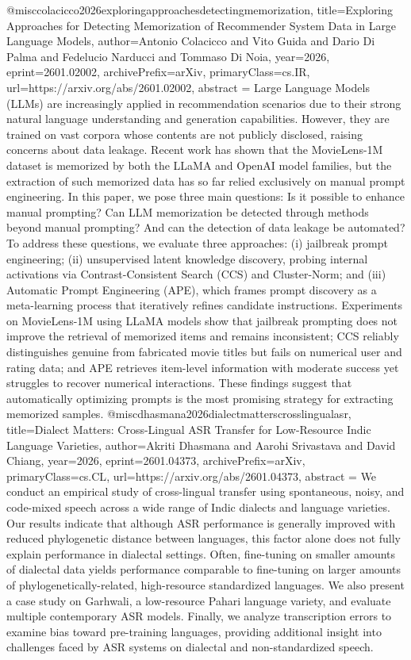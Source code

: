 {}@misc{colacicco2026exploringapproachesdetectingmemorization,
      title={Exploring Approaches for Detecting Memorization of Recommender System Data in Large Language Models}, 
      author={Antonio Colacicco and Vito Guida and Dario Di Palma and Fedelucio Narducci and Tommaso Di Noia},
      year={2026},
      eprint={2601.02002},
      archivePrefix={arXiv},
      primaryClass={cs.IR},
      url={https://arxiv.org/abs/2601.02002},
      abstract = {Large Language Models (LLMs) are increasingly applied in recommendation scenarios due to their strong natural language understanding and generation capabilities. However, they are trained on vast corpora whose contents are not publicly disclosed, raising concerns about data leakage. Recent work has shown that the MovieLens-1M dataset is memorized by both the LLaMA and OpenAI model families, but the extraction of such memorized data has so far relied exclusively on manual prompt engineering. In this paper, we pose three main questions: Is it possible to enhance manual prompting? Can LLM memorization be detected through methods beyond manual prompting? And can the detection of data leakage be automated? To address these questions, we evaluate three approaches: (i) jailbreak prompt engineering; (ii) unsupervised latent knowledge discovery, probing internal activations via Contrast-Consistent Search (CCS) and Cluster-Norm; and (iii) Automatic Prompt Engineering (APE), which frames prompt discovery as a meta-learning process that iteratively refines candidate instructions. Experiments on MovieLens-1M using LLaMA models show that jailbreak prompting does not improve the retrieval of memorized items and remains inconsistent; CCS reliably distinguishes genuine from fabricated movie titles but fails on numerical user and rating data; and APE retrieves item-level information with moderate success yet struggles to recover numerical interactions. These findings suggest that automatically optimizing prompts is the most promising strategy for extracting memorized samples.}
}@misc{dhasmana2026dialectmatterscrosslingualasr,
      title={Dialect Matters: Cross-Lingual ASR Transfer for Low-Resource Indic Language Varieties}, 
      author={Akriti Dhasmana and Aarohi Srivastava and David Chiang},
      year={2026},
      eprint={2601.04373},
      archivePrefix={arXiv},
      primaryClass={cs.CL},
      url={https://arxiv.org/abs/2601.04373},
      abstract = {We conduct an empirical study of cross-lingual transfer using spontaneous, noisy, and code-mixed speech across a wide range of Indic dialects and language varieties. Our results indicate that although ASR performance is generally improved with reduced phylogenetic distance between languages, this factor alone does not fully explain performance in dialectal settings. Often, fine-tuning on smaller amounts of dialectal data yields performance comparable to fine-tuning on larger amounts of phylogenetically-related, high-resource standardized languages. We also present a case study on Garhwali, a low-resource Pahari language variety, and evaluate multiple contemporary ASR models. Finally, we analyze transcription errors to examine bias toward pre-training languages, providing additional insight into challenges faced by ASR systems on dialectal and non-standardized speech.}
}
